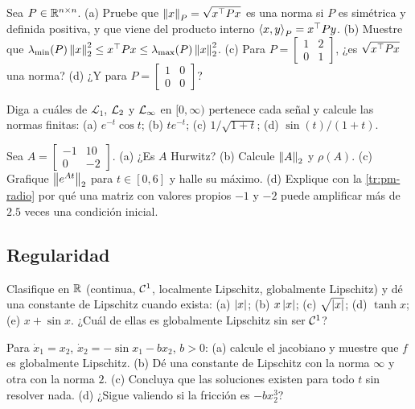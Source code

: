 \begin{problema}\label{prob:pm-pesada}
Sea $P\in\mathbb{R}^{n\times n}$. (a) Pruebe que $\left\lVert x\right\rVert_P=\sqrt{x^{\top} Px}$ es una norma si $P$ es simétrica y definida positiva, y que viene del producto interno $\left\langle x,y\right\rangle_P=x^{\top} Py$. (b) Muestre que $\lambda_{\min}(P)\left\lVert x\right\rVert_2^2\le x^{\top} Px\le\lambda_{\max}(P)\left\lVert x\right\rVert_2^2$. (c) Para $P=\begin{bmatrix}1&2\\0&1\end{bmatrix}$, ¿es $\sqrt{x^{\top} Px}$ una norma? (d) ¿Y para $P=\begin{bmatrix}1&0\\0&0\end{bmatrix}$?
\end{problema}

\begin{problema}[señales]\label{prob:pm-senales}
Diga a cuáles de $\mathcal{L}_1$, $\mathcal{L}_{2}$ y $\mathcal{L}_{\infty}$ en $[0,\infty)$ pertenece cada señal y calcule las normas finitas: (a) $e^{-t}\cos t$; (b) $te^{-t}$; (c) $1/\sqrt{1+t}$; (d) $\sin(t)/(1+t)$.
\end{problema}

\begin{problema}\label{prob:pm-transitorio}
Sea $A=\begin{bmatrix}-1&10\\0&-2\end{bmatrix}$. (a) ¿Es $A$ Hurwitz? (b) Calcule $\left\lVert A\right\rVert_2$ y $\rho(A)$. (c) \etiquetaM{} Grafique $\left\lVert e^{At}\right\rVert_2$ para $t\in[0,6]$ y halle su máximo. (d) Explique con la \cref{tr:pm-radio} por qué una matriz con valores propios $-1$ y $-2$ puede amplificar más de $2.5$ veces una condición inicial.
\end{problema}

\subsection*{Regularidad}

\begin{problema}[clasificar]\label{prob:pm-clasificar}
Clasifique en $\mathbb{R}$ (continua, $\mathcal{C}^{1}$, localmente Lipschitz, globalmente Lipschitz) y dé una constante de Lipschitz cuando exista: (a) $\left\lvert x\right\rvert$; (b) $x\left\lvert x\right\rvert$; (c) $\sqrt{\left\lvert x\right\rvert}$; (d) $\tanh x$; (e) $x+\sin x$. ¿Cuál de ellas es globalmente Lipschitz sin ser $\mathcal{C}^{1}$?
\end{problema}

\begin{problema}[el péndulo]\label{prob:pm-pendulo}
Para $\dot x_1=x_2$, $\dot x_2=-\sin x_1-bx_2$, $b>0$: (a) calcule el jacobiano y muestre que $f$ es globalmente Lipschitz. (b) Dé una constante de Lipschitz con la norma $\infty$ y otra con la norma $2$. (c) Concluya que las soluciones existen para todo $t$ sin resolver nada. (d) ¿Sigue valiendo si la fricción es $-bx_2^3$?
\end{problema}

